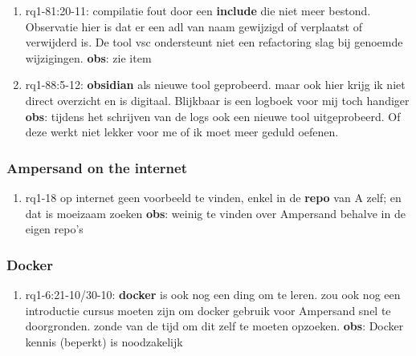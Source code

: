 \begin{enumerate}
    \item rq1-81:20-11: compilatie fout door een \textbf{include} die niet meer bestond. Observatie hier is dat er een adl van naam gewijzigd of verplaatst of verwijderd is. De tool \acrlong{vsc} ondersteunt niet een refactoring slag bij genoemde wijzigingen. 
    \newline\textbf{obs}: zie item

    \item rq1-88:5-12: \textbf{obsidian} als nieuwe tool geprobeerd. maar ook hier krijg ik niet direct overzicht en is digitaal. Blijkbaar is een logboek voor mij toch handiger
    \newline\textbf{obs}: tijdens het schrijven van de logs ook een nieuwe tool uitgeprobeerd. 
    Of deze werkt niet lekker voor me of ik moet meer geduld oefenen.

\end{enumerate}

\subsubsection{Ampersand on the internet}
\begin{comment}
plaats hier de afgehandelde items.
\end{comment}
\begin{enumerate}
    \item rq1-18 op internet geen voorbeeld te vinden, enkel in de \textbf{repo} van A zelf; en dat is moeizaam zoeken    
    \newline\textbf{obs}: weinig  te vinden over Ampersand behalve in de eigen repo's
    
\end{enumerate}

\subsubsection{Docker}
\begin{comment}
plaats hier de afgehandelde items.
\end{comment}
\begin{enumerate}
    \item rq1-6:21-10/30-10: \textbf{docker} is ook nog een ding om te leren. zou ook nog een introductie cursus moeten zijn om docker gebruik voor Ampersand snel te doorgronden. zonde van de tijd om dit zelf te moeten opzoeken.
    \newline\textbf{obs}: Docker kennis (beperkt) is noodzakelijk
    
\end{enumerate}

